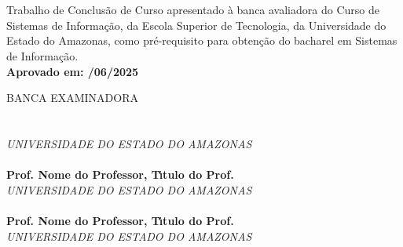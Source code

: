 
\begin{center}
\bf \MakeUppercase{\nome}\\[1.5 cm]
\end{center}

\begin{center}
\bf \MakeUppercase{\titulo}\\[1.5cm]
\end{center}

\hspace*{8cm}
\begin{minipage}{8cm}

Trabalho de Conclus\~{a}o de Curso apresentado \`{a}
banca avaliadora do Curso de Sistemas de Informa\c{c}\~{a}o,
da Escola Superior de Tecnologia, da Universidade do Estado do Amazonas,
como pr\'e-requisito para obten\c{c}\~{a}o do bacharel em Sistemas de Informa\c{c}\~{a}o.\\

\large \bf Aprovado em:  /06/2025
\end{minipage}

BANCA EXAMINADORA\\[12 pt]

\noindent \hrulefill \hspace*{6cm} \\
\noindent \textbf{\orientador}\\
\textit{UNIVERSIDADE DO ESTADO DO AMAZONAS}\\[0.5cm]

\noindent \hrulefill \hspace*{6cm} \\
\noindent \textbf{Prof. Nome do Professor, T\'{\i}tulo do Prof.}\\
\textit{UNIVERSIDADE DO ESTADO DO AMAZONAS}\\[0.5cm]

\noindent \hrulefill \hspace*{6cm} \\
\noindent \textbf{Prof. Nome do Professor, T\'{\i}tulo do Prof.}\\
\textit{UNIVERSIDADE DO ESTADO DO AMAZONAS}\\
